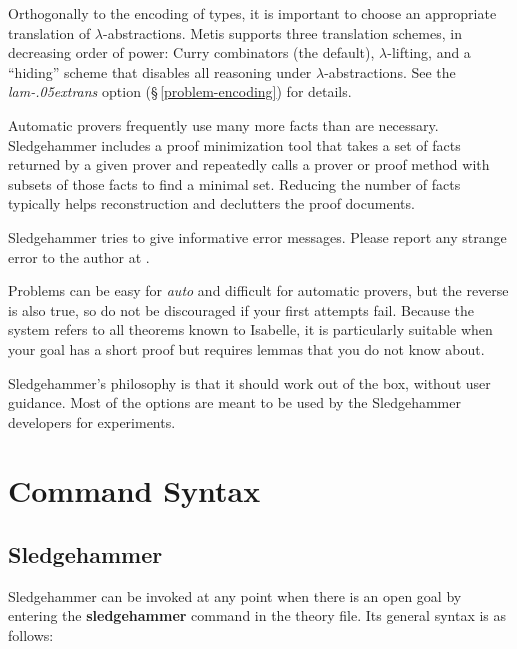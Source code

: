 \documentclass[a4paper,12pt]{article}
\let\oldS=\S
\def\S{\oldS\,}
\renewcommand\_{\hbox{\textunderscore\kern-.05ex}}
\begin{document}
Orthogonally to the encoding of types, it is important to choose an appropriate
translation of $\lambda$-abstractions. Metis supports three translation
schemes, in decreasing order of power: Curry combinators (the default),
$\lambda$-lifting, and a ``hiding'' scheme that disables all reasoning under
$\lambda$-abstractions. See the \textit{lam\_trans} option
(\S\ref{problem-encoding}) for details.



Automatic provers frequently use many more facts than are necessary.
Sledgehammer includes a proof minimization tool that takes a set of facts returned by
a given prover and repeatedly calls a prover or proof method with subsets of
those facts to find a minimal set. Reducing the number of facts typically helps
reconstruction and declutters the proof documents.



Sledgehammer tries to give informative error messages. Please report any strange
error to the author at \authoremail.



Problems can be easy for \textit{auto} and difficult for automatic provers, but
the reverse is also true, so do not be discouraged if your first attempts fail.
Because the system refers to all theorems known to Isabelle, it is particularly
suitable when your goal has a short proof but requires lemmas that you do not
know about.



Sledgehammer's philosophy is that it should work out of the box, without user
guidance. Most of the options are meant to be used by the Sledgehammer
developers for experiments.


\section{Command Syntax}
\label{command-syntax}

\subsection{Sledgehammer}
\label{sledgehammer}

Sledgehammer can be invoked at any point when there is an open goal by entering
the \textbf{sledgehammer} command in the theory file. Its general syntax is as
follows:
\end{document}
